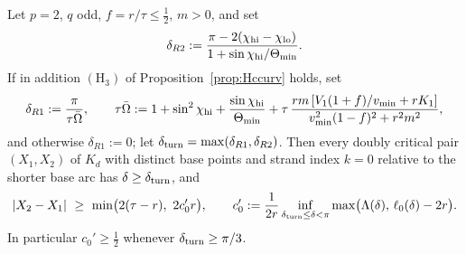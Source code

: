 \begin{proposition}[pairs on the same strand, $p=2$, sharpened]\label{prop:samestrand}
Let $p=2$, $q$ odd, $f=r/\tau\le\frac12$, $m>0$, and set
\[
\delta_{R2}:=\frac{\pi-2(\chi_{\rm hi}-\chi_{\rm lo})}{1+\sin\chi_{\rm hi}/\Theta_{\min}} .
\]
If in addition $(\mathrm H_3)$ of Proposition~\ref{prop:Hccurv} holds, set
\[
\delta_{R1}:=\frac{\pi}{\tau\bar\Omega},\qquad
\tau\bar\Omega:=1+\sin^2\chi_{\rm hi}+\frac{\sin\chi_{\rm hi}}{\Theta_{\min}}
+\tau\,\frac{rm\,[V_1(1+f)/v_{\min}+rK_1]}{v_{\min}^2(1-f)^2+r^2m^2},
\]
and otherwise $\delta_{R1}:=0$; let $\delta_{\rm turn}=\max(\delta_{R1},\delta_{R2})$. Then every doubly critical pair
$(X_1,X_2)$ of $K_d$ with distinct base points and strand index $k=0$ relative to the shorter base arc has
$\delta\ge\delta_{\rm turn}$, and
\[
|X_2-X_1|\ \ge\ \min\bigl(2(\tau-r),\ 2c_0'r\bigr),\qquad
c_0':=\frac1{2r}\inf_{\delta_{\rm turn}\le\delta<\pi}\max\bigl(\Lambda(\delta),\,\ell_0(\delta)-2r\bigr).
\]
In particular $c_0'\ge\frac12$ whenever $\delta_{\rm turn}\ge\pi/3$.
\end{proposition}

